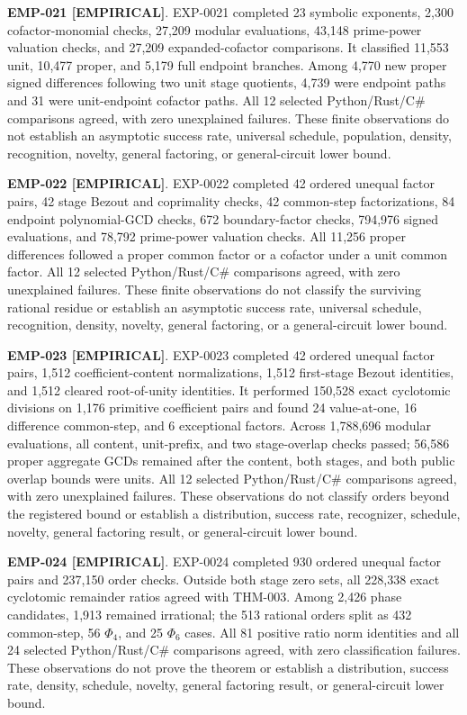 \documentclass[11pt]{article}
\newcommand{\claimstatus}[2]{\textbf{#1 [#2]}}
\begin{document}
\claimstatus{EMP-021}{EMPIRICAL}. EXP-0021 completed 23 symbolic exponents,
2,300 cofactor-monomial checks, 27,209 modular evaluations, 43,148
prime-power valuation checks, and 27,209 expanded-cofactor comparisons.
It classified 11,553 unit, 10,477 proper, and 5,179 full endpoint branches.
Among 4,770 new proper signed differences following two unit stage
quotients, 4,739 were endpoint paths and 31 were unit-endpoint cofactor
paths. All 12 selected Python/Rust/C\# comparisons agreed, with zero
unexplained failures. These finite observations do not establish an
asymptotic success rate, universal schedule, population, density,
recognition, novelty, general factoring, or general-circuit lower bound.

\claimstatus{EMP-022}{EMPIRICAL}. EXP-0022 completed 42 ordered unequal
factor pairs, 42 stage Bezout and coprimality checks, 42 common-step
factorizations, 84 endpoint polynomial-GCD checks, 672 boundary-factor
checks, 794,976 signed evaluations, and 78,792 prime-power valuation checks.
All 11,256 proper differences followed a proper common factor or a cofactor
under a unit common factor. All 12 selected Python/Rust/C\# comparisons
agreed, with zero unexplained failures. These finite observations do not
classify the surviving rational residue or establish an asymptotic success
rate, universal schedule, recognition, density, novelty, general factoring,
or a general-circuit lower bound.

\claimstatus{EMP-023}{EMPIRICAL}. EXP-0023 completed 42 ordered unequal
factor pairs, 1,512 coefficient-content normalizations, 1,512 first-stage
Bezout identities, and 1,512 cleared root-of-unity identities. It performed
150,528 exact cyclotomic divisions on 1,176 primitive coefficient pairs and
found 24 value-at-one, 16 difference common-step, and 6 exceptional factors.
Across 1,788,696 modular evaluations, all content, unit-prefix, and two
stage-overlap checks passed; 56,586 proper aggregate GCDs remained after the
content, both stages, and both public overlap bounds were units. All 12
selected Python/Rust/C\# comparisons agreed, with zero unexplained failures.
These observations do not classify orders beyond the registered bound or
establish a distribution, success rate, recognizer, schedule, novelty,
general factoring result, or general-circuit lower bound.

\claimstatus{EMP-024}{EMPIRICAL}. EXP-0024 completed 930 ordered unequal
factor pairs and 237,150 order checks. Outside both stage zero sets, all
228,338 exact cyclotomic remainder ratios agreed with THM-003. Among 2,426
phase candidates, 1,913 remained irrational; the 513 rational orders split
as 432 common-step, 56 \(\Phi_4\), and 25 \(\Phi_6\) cases. All 81 positive
ratio norm identities and all 24 selected Python/Rust/C\# comparisons agreed,
with zero classification failures. These observations do not prove the
theorem or establish a distribution, success rate, density, schedule,
novelty, general factoring result, or general-circuit lower bound.
\end{document}
